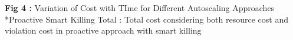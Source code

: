 \textbf{Fig 4 :} Variation of Cost with TIme for Different Autoscaling Approaches
*Proactive Smart Killing Total : Total cost considering both resource cost and violation cost in proactive approach with smart killing